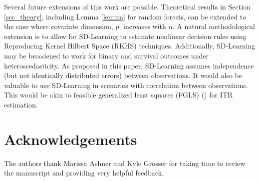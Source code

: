 \documentclass[useAMS,usenatbib]{biom}
\begin{document}
Several future extensions of this work are possible. Theoretical results in Section \ref{sec_theory}, including Lemma \ref{lemma} for random forests, can be extended to the case where covariate dimension, $p$, increases with $n$. A natural methodological extension is to allow for SD-Learning to estimate nonlinear decision rules using Reproducing Kernel Hilbert Space (RKHS) techniques. Additionally, SD-Learning may be broadened to work for binary and survival outcomes under heteroscedasticity. As proposed in this paper, SD-Learning assumes independence (but not identically distributed errors) between observations. It would also be valuable to use SD-Learning in scenarios with correlation between observations. This would be akin to feasible generalized least squares (FGLS) (\cite{olive_wls_2017}) for ITR estimation.



\backmatter

\section*{Acknowledgements}

The authors thank Marissa Ashner and Kyle Grosser for taking time to review the manuscript and providing very helpful feedback.

 

%



\appendix






\label{lastpage}


\end{document}
